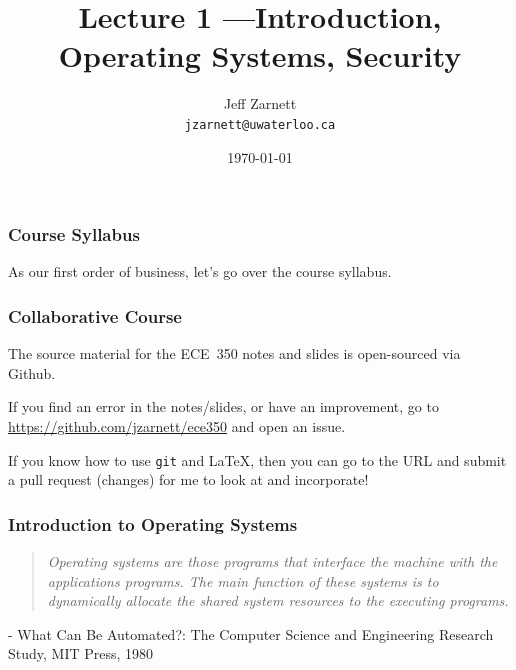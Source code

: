 

\title{Lecture 1 ---Introduction, Operating Systems, Security}

\author{Jeff Zarnett \\ \small \texttt{jzarnett@uwaterloo.ca}}
\date{\today}




\begin{frame}
  \titlepage

 \end{frame}

\begin{frame}
\frametitle{Course Syllabus}

As our first order of business, let's go over the course syllabus.

\end{frame}

\begin{frame}
\frametitle{Collaborative Course}

The source material for the ECE~350 notes and slides is open-sourced via Github. 

If you find an error in the notes/slides, or have an improvement, go to \url{https://github.com/jzarnett/ece350} and open an issue. 

If you know how to use \texttt{git} and \LaTeX, then you can go to the URL and submit a pull request (changes) for me to look at and incorporate!


\end{frame}

\begin{frame}
\frametitle{Introduction to Operating Systems}

\begin{quote}
\textit{Operating systems are those programs that interface the machine with the applications programs. The main function of these systems is to dynamically allocate the shared system resources to the executing programs.}
\end{quote}

\hfill - What Can Be Automated?: The Computer Science and Engineering Research Study, MIT Press, 1980

\end{frame}


